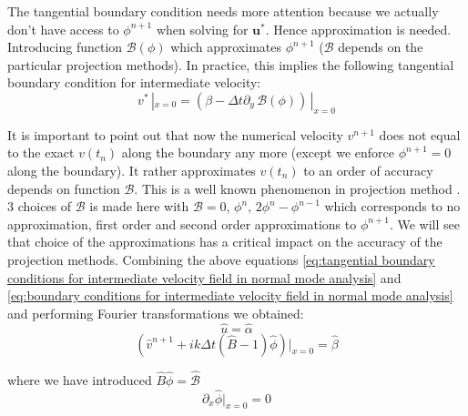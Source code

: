 The tangential boundary condition needs more attention because we actually don't have access to $\phi^{n+1}$ when solving for $\textbf{u}^*$. Hence approximation is needed. Introducing function $\mathcal{B} (\phi)$ which approximates $\phi^{n+1}$ ($\mathcal{B}$ depends on the particular projection methods). In practice, this implies the following tangential boundary condition for intermediate velocity:
\begin{dmath}\label{eq:tangential boundary conditions for intermediate velocity field in normal mode analysis}
v^* \,|_{x = 0} = (\beta - \Delta t \partial_y\, \mathcal{B}(\phi)) \,|_{x = 0}
\end{dmath}

It is important to point out that now the numerical velocity $v^{n+1}$ does not equal to the exact $v(t_n)$ along the boundary any more (except we enforce $\phi^{n+1}=0$ along the boundary). It rather approximates $v(t_n)$ to an order of accuracy depends on function $\mathcal{B}$. This is a well known phenomenon in projection method \cite{strikwerda1999accuracy,brown2001accurate}. 3 choices of $\mathcal{B}$ is made here with $\mathcal{B}=0,\,\phi^n,\,2\phi^n-\phi^{n-1}$ which corresponds to no approximation, first order and second order approximations to $\phi^{n+1}$. We will see that choice of the approximations has a critical impact on the accuracy of the projection methods. Combining the above equations \eqref{eq:tangential boundary conditions for intermediate velocity field in normal mode analysis} and \eqref{eq:boundary conditions for intermediate velocity field in normal mode analysis} and performing Fourier transformations we obtained:\\

\begin{dmath}
\hat{u}=\hat{\alpha}
\end{dmath}
\begin{dmath}
(\hat{v}^{n+1}  + ik \Delta t (\hat{B} - 1) \hat{\phi} )|_{x = 0} = \hat{\beta}
\end{dmath}

where we have introduced $\hat{B}\hat{\phi} = \hat{\mathcal{B}}$\\

\begin{dmath}
\partial_x \hat{\phi} |_{x = 0} = 0
\end{dmath}


